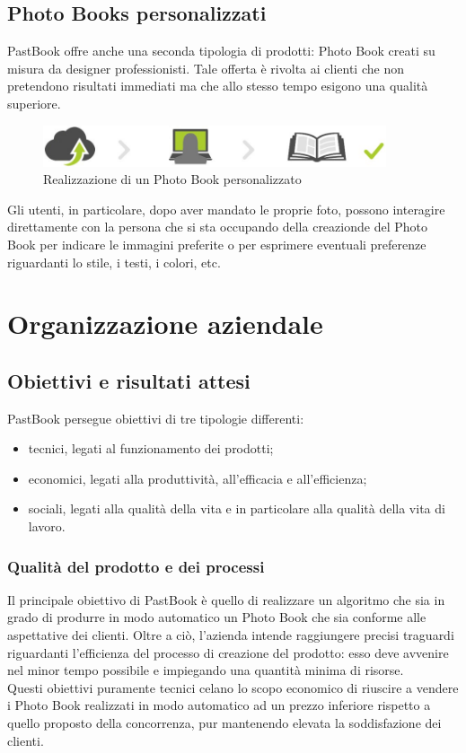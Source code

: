		\subsection{Photo Books personalizzati}
			PastBook offre anche una seconda tipologia di prodotti: Photo Book creati su misura da designer professionisti. Tale offerta
			è rivolta ai clienti che non pretendono risultati immediati ma che allo stesso tempo esigono una qualità superiore.
			\begin{figure}[H]
				\centering
				\includegraphics[width=0.9\textwidth]{capitolo_1/immagini/photo_book_personalizzato.png}
				\caption[Realizzazione di un Photo Book personalizzato]{Realizzazione di un Photo Book personalizzato\protect\footnotemark}
			\end{figure}
			\noindent Gli utenti, in particolare, dopo aver mandato le proprie foto, possono interagire direttamente con la persona che
			si sta occupando della creazionde del Photo Book per indicare le immagini preferite o per esprimere eventuali preferenze
			riguardanti lo stile, i testi, i colori, etc.
	\section{Organizzazione aziendale}
		\subsection{Obiettivi e risultati attesi}
			PastBook persegue obiettivi di tre tipologie differenti:
			\begin{itemize}
				\item tecnici, legati al funzionamento dei prodotti;
				\item economici, legati alla produttività, all'efficacia e all'efficienza;
				\item sociali, legati alla qualità della vita e in particolare alla qualità della vita di lavoro.
			\end{itemize}
			\subsubsection{Qualità del prodotto e dei processi}
				Il principale obiettivo di PastBook è quello di realizzare un algoritmo che sia in grado di produrre in modo
				automatico un Photo Book che sia conforme alle aspettative dei clienti. Oltre a ciò, l'azienda intende raggiungere
				precisi traguardi riguardanti l'efficienza del processo di creazione del prodotto: esso deve avvenire nel minor tempo
				possibile e impiegando una quantità minima di risorse.\\
				Questi obiettivi puramente tecnici celano lo scopo economico di riuscire a vendere i Photo Book realizzati in modo
				automatico ad un prezzo inferiore rispetto a quello proposto della concorrenza, pur mantenendo elevata la
				soddisfazione dei clienti.
